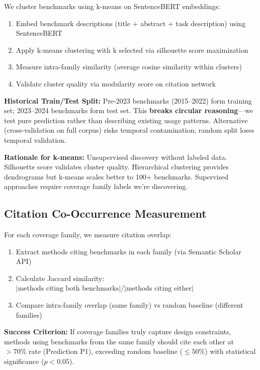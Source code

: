 We cluster benchmarks using k-means on SentenceBERT embeddings:

\begin{enumerate}
\item Embed benchmark descriptions (title + abstract + task description) using SentenceBERT
\item Apply k-means clustering with k selected via silhouette score maximization
\item Measure intra-family similarity (average cosine similarity within clusters)
\item Validate cluster quality via modularity score on citation network
\end{enumerate}

\textbf{Historical Train/Test Split:} Pre-2023 benchmarks (2015--2022) form training set; 2023--2024 benchmarks form test set. This \textbf{breaks circular reasoning}---we test pure prediction rather than describing existing usage patterns. Alternative (cross-validation on full corpus) risks temporal contamination; random split loses temporal validation.

\textbf{Rationale for k-means:} Unsupervised discovery without labeled data. Silhouette score validates cluster quality. Hierarchical clustering provides dendrograms but k-means scales better to 100+ benchmarks. Supervised approaches require coverage family labels we're discovering.

\subsection{Citation Co-Occurrence Measurement}

For each coverage family, we measure citation overlap:

\begin{enumerate}
\item Extract methods citing benchmarks in each family (via Semantic Scholar API)
\item Calculate Jaccard similarity: $|\text{methods citing both benchmarks}| / |\text{methods citing either}|$
\item Compare intra-family overlap (same family) vs random baseline (different families)
\end{enumerate}

\textbf{Success Criterion:} If coverage families truly capture design constraints, methods using benchmarks from the same family should cite each other at $>70\%$ rate (Prediction P1), exceeding random baseline ($\leq 50\%$) with statistical significance ($p<0.05$).

